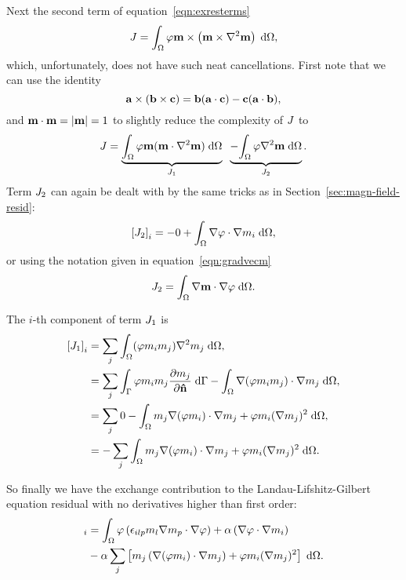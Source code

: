 Next the second term of equation~\eqref{eqn:exresterms}
\begin{equation}
  J = {\int_{\Omega} \varphi \mathbf{m} \times \left( \mathbf{m} \times \nabla^2 \mathbf{m} \right) {\; \text{d}} {\Omega}}, \notag
\end{equation}
which, unfortunately, does not have such neat cancellations.
First note that we can use the identity
\begin{equation}
  {\mathbf{a}} \times ( {\mathbf{b}} \times {\mathbf{c}} ) = {\mathbf{b}} ( {\mathbf{a}} \cdot {\mathbf{c}}) - {\mathbf{c}} ( {\mathbf{a}} \cdot {\mathbf{b}}),
  \label{eqn:double-cross-id}
\end{equation}
and $\mathbf{m} \cdot \mathbf{m} = \lvert \mathbf{m} \rvert = 1$ to slightly reduce the complexity of $J$ to
\begin{equation}
  J = \underbrace{{\int_{\Omega} \varphi \mathbf{m} (\mathbf{m} \cdot \nabla^2 \mathbf{m}) {\; \text{d}} {\Omega}}}_{J_1} \;\;
  \underbrace{- {\int_{\Omega} \varphi \nabla^2 \mathbf{m} {\; \text{d}} {\Omega}}}_{J_2}.
\end{equation}
Term $J_2$ can again be dealt with by the same tricks as in Section~\ref{sec:magn-field-resid}:
\begin{equation}
  \left[ J_2 \right]_i = -0 + {\int_{\Omega} \nabla \varphi \cdot \nabla m_i {\; \text{d}} {\Omega}},
\end{equation}
or using the notation given in equation~\eqref{eqn:gradvecm}
\begin{equation}
  J_2 = \int_\Omega \nabla \mathbf{m} \cdot \nabla \varphi  {\; \text{d}}\Omega.
\end{equation}

The $i$-th component of term $J_1$ is
\begin{align}
  \left[J_1\right]_i &= \sum_j \int_\Omega (\varphi m_i  m_j) \nabla^2 m_j {\; \text{d}}\Omega, \notag \\
  &= \sum_j \int_{\Gamma} \varphi  m_i  m_j \frac{\partial m_j}{\partial \mathbf{\hat{n}}} {\; \text{d}}{\Gamma}
  - \int_\Omega  \nabla(\varphi m_i  m_j) \cdot \nabla m_j  {\; \text{d}}\Omega, \notag \\
  &= \sum_j 0 - \int_\Omega m_j \nabla(\varphi m_i) \cdot \nabla m_j
  + \varphi m_i (\nabla m_j)^2 {\; \text{d}}\Omega, \notag \\
  &= - \sum_j \int_\Omega m_j \nabla(\varphi m_i) \cdot \nabla m_j
  + \varphi m_i (\nabla m_j)^2 {\; \text{d}}\Omega.
\end{align}

So finally we have the exchange contribution to the Landau-Lifshitz-Gilbert equation residual with no derivatives higher than first order:
\begin{align}
  [\rex]_i &= \int_\magd \tbf\left(  \epsilon_{ilp} m_l\nabla m_p \cdot \nabla \tbf \right)
  + \dampc \left(\nabla \tbf \cdot \nabla m_i \right) \notag\\
  &- \dampc \sum_j \left[ m_j
    \left(\nabla(\tbf m_i) \cdot \nabla m_j \right)
    + \tbf m_i (\nabla m_j)^2 \right] \d\magd.
\end{align}


